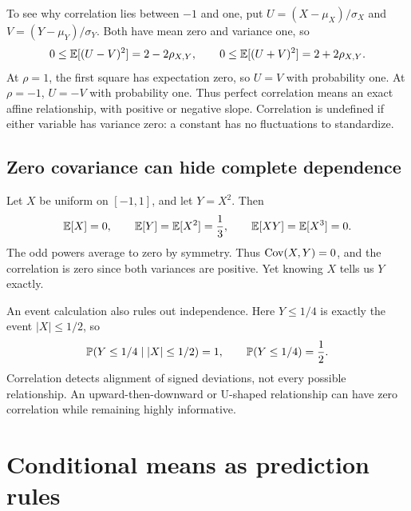 To see why correlation lies between \(-1\) and one, put
\(U=(X-\mu_X)/\sigma_X\) and \(V=(Y-\mu_Y)/\sigma_Y\). Both have
mean zero and variance one, so
\[
  0\le\mathbb{E}[(U-V)^2]=2-2\rho_{X,Y},\qquad
  0\le\mathbb{E}[(U+V)^2]=2+2\rho_{X,Y}.
\]
At \(\rho=1\), the first square has expectation zero, so \(U=V\)
with probability one. At \(\rho=-1\), \(U=-V\) with probability one.
Thus perfect correlation means an exact affine relationship, with
positive or negative slope. Correlation is undefined if either variable
has variance zero: a constant has no fluctuations to standardize.

\subsection{Zero covariance can hide complete dependence}

Let \(X\) be uniform on \([-1,1]\), and let \(Y=X^2\). Then
\[
  \mathbb{E}[X]=0,\qquad \mathbb{E}[Y]=\mathbb{E}[X^2]=\frac13,
  \qquad \mathbb{E}[XY]=\mathbb{E}[X^3]=0.
\]
The odd powers average to zero by symmetry. Thus
\(\operatorname{Cov}(X,Y)=0\), and the correlation is zero since both variances
are positive. Yet knowing \(X\) tells us \(Y\) exactly.

An event calculation also rules out independence. Here
\(Y\le1/4\) is exactly the event \(|X|\le1/2\), so
\[
  \mathbb{P}(Y\le1/4\mid |X|\le1/2)=1,
  \qquad \mathbb{P}(Y\le1/4)=\frac12.
\]
Correlation detects alignment of signed deviations, not every possible
relationship. An upward-then-downward or U-shaped relationship can
have zero correlation while remaining highly informative.

\section{Conditional means as prediction rules}
\label{sec:conditional-moments}

